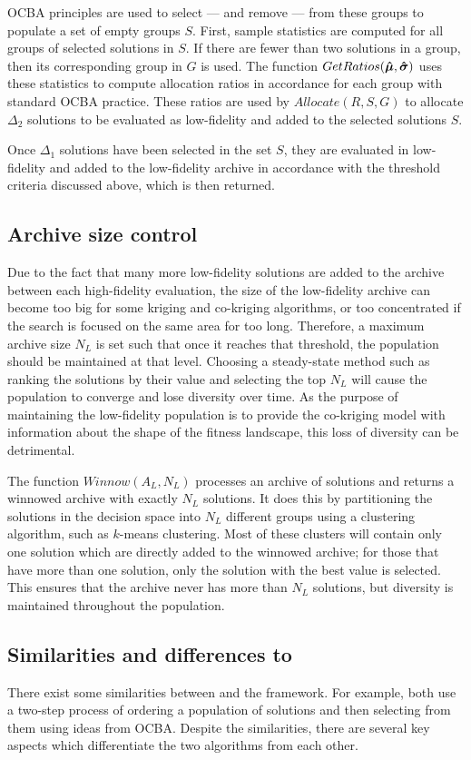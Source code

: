 OCBA principles are used to select --- and remove --- from these groups to populate a set of empty groups $S$. First, sample statistics are computed for all groups of selected solutions in $S$. If there are fewer than two solutions in a group, then its corresponding group in $G$ is used. The function $GetRatios(\boldsymbol{\hat{\mu}},\boldsymbol{\hat{\sigma}})$ uses these statistics to compute allocation ratios in accordance for each group with standard OCBA practice. These ratios are used by $Allocate(R,S,G)$ to allocate $\Delta_2$ solutions to be evaluated as low-fidelity and added to the selected solutions $S$.

Once $\Delta_1$ solutions have been selected in the set $S$, they are evaluated in low-fidelity and added to the low-fidelity archive in accordance with the threshold criteria discussed above, which is then returned.

\subsection{Archive size control}
Due to the fact that many more low-fidelity solutions are added to the archive between each high-fidelity evaluation, the size of the low-fidelity archive can become too big for some kriging and co-kriging algorithms, or too concentrated if the search is focused on the same area for too long. Therefore, a maximum archive size $N_L$ is set such that once it reaches that threshold, the population should be maintained at that level. Choosing a steady-state method such as ranking the solutions by their value and selecting the top $N_L$ will cause the population to converge and lose diversity over time. As the purpose of maintaining the low-fidelity population is to provide the co-kriging model with information about the shape of the fitness landscape, this loss of diversity can be detrimental. 

The function $Winnow(A_L,N_L)$ processes an archive of solutions and returns a winnowed archive with exactly $N_L$ solutions. It does this by partitioning the solutions in the decision space into $N_L$ different groups using a clustering algorithm, such as $k$-means clustering. Most of these clusters will contain only one solution which are directly added to the winnowed archive; for those that have more than one solution, only the solution with the best value is selected. This ensures that the archive never has more than $N_L$ solutions, but diversity is maintained throughout the population.

\subsection{Similarities and differences to \motos{}}
There exist some similarities between \AlgName{} and the \motos{} framework. For example, both use a two-step process of ordering a population of solutions and then selecting from them using ideas from OCBA. Despite the similarities, there are several key aspects which differentiate the two algorithms from each other. 

